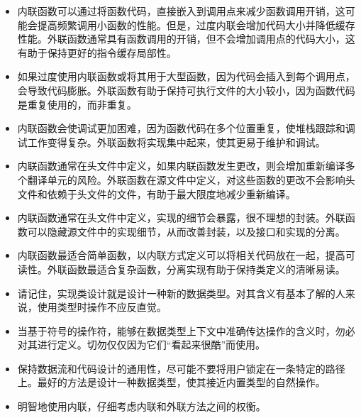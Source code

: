 \begin{itemize}
\item
内联函数可以通过将函数代码，直接嵌入到调用点来减少函数调用开销，这可能会提高频繁调用小函数的性能。但是，过度内联会增加代码大小并降低缓存性能。外联函数通常具有函数调用的开销，但不会增加调用点的代码大小，这有助于保持更好的指令缓存局部性。

\item
如果过度使用内联函数或将其用于大型函数，因为代码会插入到每个调用点，会导致代码膨胀。外联函数有助于保持可执行文件的大小较小，因为函数代码是重复使用的，而非重复。

\item
内联函数会使调试更加困难，因为函数代码在多个位置重复，使堆栈跟踪和调试工作变得复杂。外联函数将实现集中起来，使其更易于维护和调试。

\item
内联函数通常在头文件中定义，如果内联函数发生更改，则会增加重新编译多个翻译单元的风险。外联函数在源文件中定义，对这些函数的更改不会影响头文件和依赖于头文件的文件，有助于最大限度地减少重新编译。

\item
内联函数通常在头文件中定义，实现的细节会暴露，很不理想的封装。外联函数可以隐藏源文件中的实现细节，从而改善封装，以及接口和实现的分离。

\item
内联函数最适合简单函数，以内联方式定义可以将相关代码放在一起，提高可读性。外联函数最适合复杂函数，分离实现有助于保持类定义的清晰易读。
\end{itemize}


\begin{itemize}
\item
请记住，实现类设计就是设计一种新的数据类型。对其含义有基本了解的人来说，使用类型时操作不应反直觉。

\item
当基于符号的操作符，能够在数据类型上下文中准确传达操作的含义时，勿必对其进行定义。切勿仅仅因为它们“看起来很酷”而使用。

\item
保持数据流和代码设计的通用性，尽可能不要将用户锁定在一条特定的路径上。最好的方法是设计一种数据类型，使其接近内置类型的自然操作。

\item
明智地使用内联，仔细考虑内联和外联方法之间的权衡。
\end{itemize}
